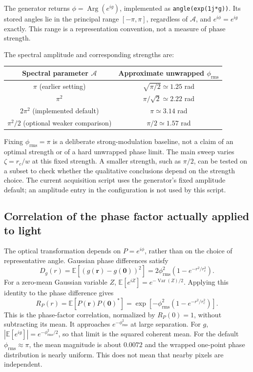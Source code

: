 \documentclass[11pt,a4paper]{article}
\newcommand{\E}{\mathbb E}
\begin{document}
The generator returns $\phi=\operatorname{Arg}(e^{ig})$, implemented as
\texttt{angle(exp(1j*g))}. Its stored angles lie in the principal range
$[-\pi,\pi]$, regardless of $\mathcal A$, and $e^{i\phi}=e^{ig}$ exactly.
This range is a representation convention, not a measure of phase strength.

The spectral amplitude and corresponding strengths are:
\begin{center}
\begin{tabular}{c|c}
Spectral parameter $\mathcal A$ & Approximate unwrapped $\phi_{\mathrm{rms}}$\\\hline
$\pi$ (earlier setting) & $\sqrt{\pi/2}\simeq1.25$ rad\\
$\pi^2$ & $\pi/\sqrt2\simeq2.22$ rad\\
$2\pi^2$ (implemented default) & $\pi\simeq3.14$ rad\\
$\pi^2/2$ (optional weaker comparison) & $\pi/2\simeq1.57$ rad
\end{tabular}
\end{center}
Fixing $\phi_{\mathrm{rms}}=\pi$ is a deliberate strong-modulation baseline,
not a claim of an optimal strength or of a hard unwrapped phase limit.
The main sweep varies $\zeta=r_c/w$ at this fixed strength. A smaller
strength, such as $\pi/2$, can be tested on a subset to check whether the
qualitative conclusions depend on the strength choice. The current acquisition
script uses the generator's fixed amplitude default; an amplitude entry in
the configuration is not used by this script.

\subsection{Correlation of the phase factor actually applied to light}
The optical transformation depends on $P=e^{i\phi}$, rather than on the
choice of representative angle. Gaussian phase differences satisfy
\begin{equation}
 D_g(r)=\E[(g(\mathbf r)-g(\mathbf0))^2]
 =2\phi_{\mathrm{rms}}^2\left(1-e^{-r^2/r_c^2}\right).
\end{equation}
For a zero-mean Gaussian variable $Z$, $\E[e^{iZ}]=e^{-\operatorname{Var}(Z)/2}$.
Applying this identity to the phase difference gives
\begin{equation}
 R_P(r)=\E[P(\mathbf r)P(\mathbf0)^*]
 =\exp\!\left[-\phi_{\mathrm{rms}}^2\left(1-e^{-r^2/r_c^2}\right)\right].
 \label{eq:phase-factor-correlation}
\end{equation}
This is the phase-factor correlation, normalized by $R_P(0)=1$, without
subtracting its mean. It approaches $e^{-\phi_{\mathrm{rms}}^2}$ at large separation.
For $g$, $|\E[e^{ig}]|=e^{-\phi_{\mathrm{rms}}^2/2}$, so that limit is the squared coherent mean.
For the default $\phi_{\mathrm{rms}}\approx\pi$, the mean magnitude is about $0.0072$ and the
wrapped one-point phase distribution is nearly uniform. This does not
mean that nearby pixels are independent.
\end{document}
